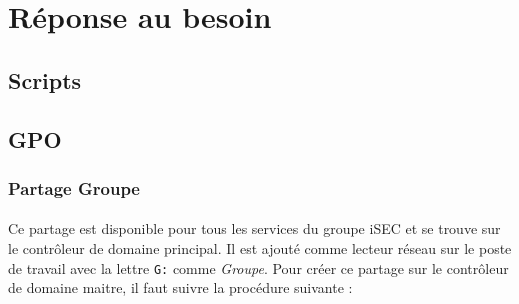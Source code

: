 \section{Réponse au besoin}
	\subsection{Scripts}
	\subsection{GPO}
		\subsubsection{Partage Groupe}
			\paragraph{}
			\label{partage_group}
				Ce partage est disponible pour tous les services du groupe iSEC et se trouve sur le contrôleur de domaine principal. Il est ajouté comme lecteur réseau sur le poste de travail avec la lettre \texttt{G:} comme \textit{Groupe}. Pour créer ce partage sur le contrôleur de domaine maitre, il faut suivre la procédure suivante :

